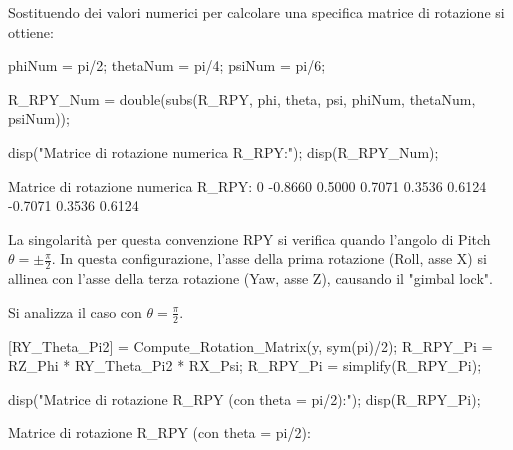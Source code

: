 \documentclass[11pt, a4paper]{article}
\begin{document}
\begin{par}
\begin{flushleft}
Sostituendo dei valori numerici per calcolare una specifica matrice di rotazione si ottiene:
\end{flushleft}
\end{par}

\begin{matlabcode}
phiNum = pi/2;   %
thetaNum = pi/4; %
psiNum = pi/6;   %

R_RPY_Num = double(subs(R_RPY, {phi, theta, psi}, {phiNum, thetaNum, psiNum}));

disp("Matrice di rotazione numerica R_RPY:");
disp(R_RPY_Num);
\end{matlabcode}
\begin{matlaboutput}
Matrice di rotazione numerica R_RPY:
         0   -0.8660    0.5000
    0.7071    0.3536    0.6124
   -0.7071    0.3536    0.6124
\end{matlaboutput}


\begin{par}
\begin{flushleft}
La singolarità per questa convenzione RPY si verifica quando l'angolo di Pitch $\theta =\pm \frac{\pi }{2}$. In questa configurazione, l'asse della prima rotazione (Roll, asse X) si allinea con l'asse della terza rotazione (Yaw, asse Z), causando il "gimbal lock".
\end{flushleft}
\end{par}

\begin{par}
\begin{flushleft}
Si analizza il caso con $\theta =\frac{\pi }{2}$.
\end{flushleft}
\end{par}

\begin{matlabcode}
[RY_Theta_Pi2] = Compute_Rotation_Matrix(y, sym(pi)/2);
R_RPY_Pi = RZ_Phi * RY_Theta_Pi2 * RX_Psi;
R_RPY_Pi = simplify(R_RPY_Pi);

disp("Matrice di rotazione R_RPY (con theta = pi/2):");
disp(R_RPY_Pi);
\end{matlabcode}
\begin{matlaboutput}
Matrice di rotazione R_RPY (con theta = pi/2):
\end{matlaboutput}
\end{document}
